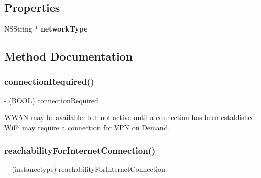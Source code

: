 \subsection*{Properties}
\begin{DoxyCompactItemize}
\item 
\mbox{\label{interface_n_f_l_o_g_reachability_a712ee2f0e492a983f97cd92fb17d62f6}} 
N\+S\+String $\ast$ {\bfseries network\+Type}
\end{DoxyCompactItemize}


\subsection{Method Documentation}
\mbox{\label{interface_n_f_l_o_g_reachability_aaec74dc64d3fff3865acfadd47578099}} 
\subsubsection{\texorpdfstring{connection\+Required()}{connectionRequired()}}
{\footnotesize\ttfamily -\/ (B\+O\+OL) connection\+Required \begin{DoxyParamCaption}{ }\end{DoxyParamCaption}}

W\+W\+AN may be available, but not active until a connection has been established. Wi\+Fi may require a connection for V\+PN on Demand. \mbox{\label{interface_n_f_l_o_g_reachability_a58284ef144dc19ec264db24f489f1adb}} 
\subsubsection{\texorpdfstring{reachability\+For\+Internet\+Connection()}{reachabilityForInternetConnection()}}
{\footnotesize\ttfamily + (instancetype) reachability\+For\+Internet\+Connection \begin{DoxyParamCaption}{ }\end{DoxyParamCaption}}

